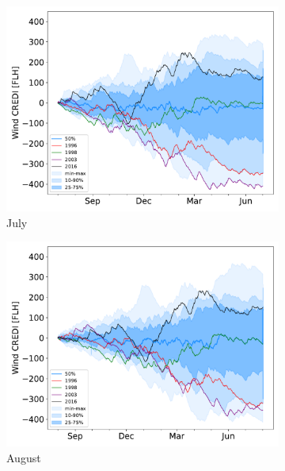 \documentclass[12pt]{iopart}
\begin{document}
\begin{figure}[b]
\begin{subfigure}[t]{0.32\linewidth}
    \includegraphics[width=\linewidth]{Figures_SI/Fig_CUMSUM_YearStart_July}
    \caption{July }
\end{subfigure}
\begin{subfigure}[t]{0.32\linewidth}
    \includegraphics[width=\linewidth]{Figures_SI/Fig_CUMSUM_YearStart_August}
    \caption{August }
\end{subfigure}
\begin{subfigure}[t]{0.32\linewidth}

\end{subfigure}
\end{figure}
\end{document}
